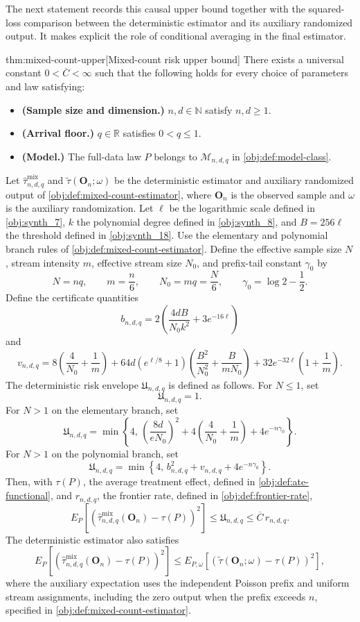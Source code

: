 The next statement records this causal upper bound together with the squared-loss comparison between the deterministic estimator and its auxiliary randomized output. It makes explicit the role of conditional averaging in the final estimator.

\begin{theoremv}{thm:mixed-count-upper}[Mixed-count risk upper bound]
There exists a universal constant \(0<\overline C<\infty\) such that the following holds for every choice of parameters and law satisfying:
\begin{itemize}
\item \textbf{(Sample size and dimension.)} \(n,d\in\mathbb N\) satisfy \(n,d\ge1\).
\item \textbf{(Arrival floor.)} \(q\in\mathbb R\) satisfies \(0<q\le1\).
\item \textbf{(Model.)} The full-data law \(P\) belongs to \(\mathcal M_{n,d,q}\) in \cref{obj:def:model-class}.
\end{itemize}
Let \(\widehat\tau^{\mathrm{mix}}_{n,d,q}\) and \(\widetilde\tau(\mathbf O_n;\omega)\) be the deterministic estimator and auxiliary randomized output of \cref{obj:def:mixed-count-estimator}, where \(\mathbf O_n\) is the observed sample and \(\omega\) is the auxiliary randomization. Let \(\ell\) be the logarithmic scale defined in \cref{obj:synth_7}, \(k\) the polynomial degree defined in \cref{obj:synth_8}, and \(B=256\ell\) the threshold defined in \cref{obj:synth_18}. Use the elementary and polynomial branch rules of \cref{obj:def:mixed-count-estimator}. Define the effective sample size \(N\), stream intensity \(m\), effective stream size \(N_0\), and prefix-tail constant \(\gamma_0\) by
\[
N=nq,\qquad m=\frac n6,\qquad N_0=mq=\frac N6,
\qquad \gamma_0=\log 2-\frac12.
\]
Define the certificate quantities
\[
b_{n,d,q}
=
2\left(\frac{4dB}{N_0k^2}+3e^{-16\ell}\right)
\]
and
\[
v_{n,d,q}
=
8\left(\frac4{N_0}+\frac1m\right)
+
64d\left(e^{\ell/8}+1\right)
\left(\frac{B^2}{N_0^2}+\frac{B}{mN_0}\right)
+
32e^{-32\ell}\left(1+\frac1m\right).
\]
The deterministic risk envelope \(\mathfrak U_{n,d,q}\) is defined as follows. For \(N\le1\), set
\[
\mathfrak U_{n,d,q}=1.
\]
For \(N>1\) on the elementary branch, set
\[
\mathfrak U_{n,d,q}
=
\min\left\{
4,\,
\left(\frac{8d}{eN_0}\right)^2
+4\left(\frac4{N_0}+\frac1m\right)
+4e^{-n\gamma_0}
\right\}.
\]
For \(N>1\) on the polynomial branch, set
\[
\mathfrak U_{n,d,q}
=
\min\left\{
4,\,
b_{n,d,q}^2+v_{n,d,q}+4e^{-n\gamma_0}
\right\}.
\]
Then, with \(\tau(P)\), the average treatment effect, defined in \cref{obj:def:ate-functional}, and \(r_{n,d,q}\), the frontier rate, defined in \cref{obj:def:frontier-rate},
\[
E_P\!\left[
\left(
\widehat\tau^{\mathrm{mix}}_{n,d,q}(\mathbf O_n)-\tau(P)
\right)^2
\right]
\le
\mathfrak U_{n,d,q}
\le
\overline C\,r_{n,d,q}.
\]
The deterministic estimator also satisfies
\[
E_P\!\left[
\left(
\widehat\tau^{\mathrm{mix}}_{n,d,q}(\mathbf O_n)-\tau(P)
\right)^2
\right]
\le
E_{P,\omega}\!\left[
\left(
\widetilde\tau(\mathbf O_n;\omega)-\tau(P)
\right)^2
\right],
\]
where the auxiliary expectation uses the independent Poisson prefix and uniform stream assignments, including the zero output when the prefix exceeds \(n\), specified in \cref{obj:def:mixed-count-estimator}.
\end{theoremv}

